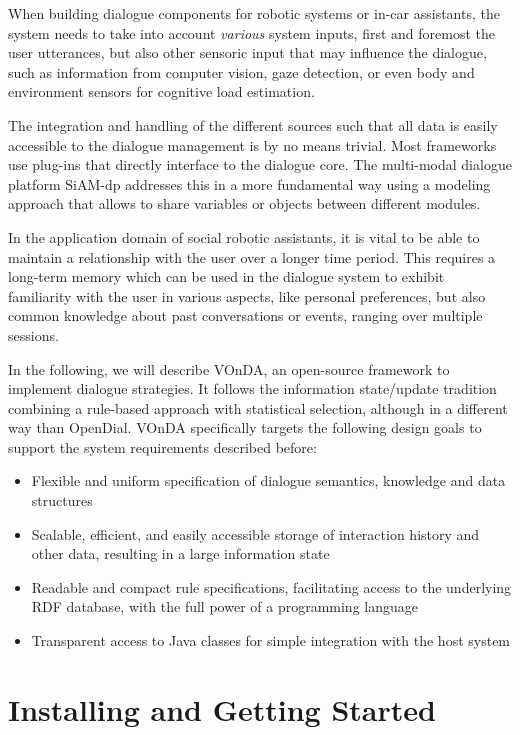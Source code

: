 \documentclass[a4paper]{report}
\newcommand{\vonda}{VOnDA\xspace}
\begin{document}
When building dialogue components for robotic systems or in-car assistants, the system
needs to take into account \emph{various} system inputs, first and foremost the
user utterances, but also other sensoric input that may influence the dialogue,
such as information from computer vision, gaze detection, or even body and
environment sensors for cognitive load estimation.

The integration and handling of the different sources such that all data is
easily accessible to the dialogue management is by no means trivial. Most
frameworks use plug-ins that directly interface to the dialogue core. The
multi-modal dialogue platform SiAM-dp \citep{nesselrath2014siam}
addresses this in a more fundamental way using a modeling approach that allows
to share variables or objects between different modules.

In the application domain of social robotic assistants, it is vital to be able
to maintain a relationship with the user over a longer time period. This requires a long-term
memory which can be used in the dialogue system to exhibit familiarity with the
user in various aspects, like personal preferences, but also common knowledge
about past conversations or events, ranging over multiple sessions.

In the following, we will describe \vonda, an open-source framework to
implement dialogue strategies. It follows the information state/update
tradition \citep{traum2003information}
combining a rule-based approach with statistical selection, although in a
different way than OpenDial. \vonda specifically targets the following design
goals to support the system requirements described before:

\begin{itemize}
  \addtolength{\itemsep}{-.6\itemsep}
\item Flexible and uniform specification of dialogue semantics, knowledge and
  data structures
\item Scalable, efficient, and easily accessible storage of interaction history
  and other data, resulting in a large information state
\item Readable and compact rule specifications, facilitating access to the
  underlying RDF database, with the full power of a programming language
\item Transparent access to Java classes for simple integration with the host
  system
\end{itemize}
\fi



%

\chapter{Installing and Getting Started}


\newpage

\newpage




\end{document}

